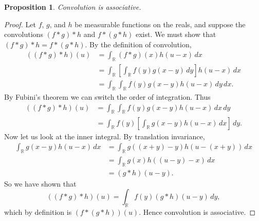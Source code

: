 \documentclass[12pt]{article}
\newtheorem*{proposition*}{Proposition}
\begin{document}
\begin{proposition*}
Convolution is associative.
\end{proposition*}

\begin{proof}

Let $f$, $g$, and $h$ be measurable functions on the reals, and
suppose the convolutions $(f*g)*h$ and $f*(g*h)$ exist.  We must show
that $(f*g)*h = f*(g*h)$.  By the definition of convolution,
\begin{align*}
((f*g)*h)(u)
&= \int_{\mathbb{R}} (f*g)(x) h(u-x)\,dx \\
&= \int_{\mathbb{R}} \left[ \int_{\mathbb{R}} f(y) g(x-y)\,dy\right] h(u-x)\,dx \\
&= \int_{\mathbb{R}} \int_{\mathbb{R}} f(y) g(x-y) h(u-x)\,dy\,dx.
\end{align*}
By Fubini's theorem we can switch the order of integration.  Thus
\begin{align*}
((f*g)*h)(u)
&= \int_{\mathbb{R}} \int_{\mathbb{R}} f(y) g(x-y) h(u-x)\,dx\,dy \\
&= \int_{\mathbb{R}} f(y) \left[\int_{\mathbb{R}} g(x-y) h(u-x)\,dx\right]\,dy.
\end{align*}
Now let us look at the inner integral.  By translation invariance,
\begin{align*}
\int_{\mathbb{R}} g(x-y) h(u-x)\,dx 
&= \int_{\mathbb{R}} g((x+y)-y) h(u-(x+y))\,dx \\
&= \int_{\mathbb{R}} g(x) h((u-y)-x)\,dx \\
&= (g*h)(u-y).
\end{align*}
So we have shown that
\[
((f*g)*h)(u) = \int_{\mathbb{R}} f(y)(g*h)(u-y)\,dy,
\]
which by definition is $(f*(g*h))(u)$.  Hence convolution is associative.
\end{proof}

\end{document}
